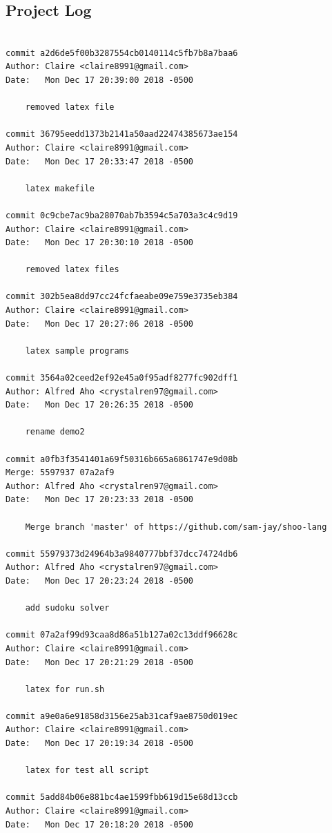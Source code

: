 \documentclass[12pt]{article}
\begin{document}
\subsection{Project Log}
\begin{lstlisting}

commit a2d6de5f00b3287554cb0140114c5fb7b8a7baa6
Author: Claire <claire8991@gmail.com>
Date:   Mon Dec 17 20:39:00 2018 -0500

    removed latex file

commit 36795eedd1373b2141a50aad22474385673ae154
Author: Claire <claire8991@gmail.com>
Date:   Mon Dec 17 20:33:47 2018 -0500

    latex makefile

commit 0c9cbe7ac9ba28070ab7b3594c5a703a3c4c9d19
Author: Claire <claire8991@gmail.com>
Date:   Mon Dec 17 20:30:10 2018 -0500

    removed latex files

commit 302b5ea8dd97cc24fcfaeabe09e759e3735eb384
Author: Claire <claire8991@gmail.com>
Date:   Mon Dec 17 20:27:06 2018 -0500

    latex sample programs

commit 3564a02ceed2ef92e45a0f95adf8277fc902dff1
Author: Alfred Aho <crystalren97@gmail.com>
Date:   Mon Dec 17 20:26:35 2018 -0500

    rename demo2

commit a0fb3f3541401a69f50316b665a6861747e9d08b
Merge: 5597937 07a2af9
Author: Alfred Aho <crystalren97@gmail.com>
Date:   Mon Dec 17 20:23:33 2018 -0500

    Merge branch 'master' of https://github.com/sam-jay/shoo-lang

commit 55979373d24964b3a9840777bbf37dcc74724db6
Author: Alfred Aho <crystalren97@gmail.com>
Date:   Mon Dec 17 20:23:24 2018 -0500

    add sudoku solver

commit 07a2af99d93caa8d86a51b127a02c13ddf96628c
Author: Claire <claire8991@gmail.com>
Date:   Mon Dec 17 20:21:29 2018 -0500

    latex for run.sh

commit a9e0a6e91858d3156e25ab31caf9ae8750d019ec
Author: Claire <claire8991@gmail.com>
Date:   Mon Dec 17 20:19:34 2018 -0500

    latex for test all script

commit 5add84b06e881bc4ae1599fbb619d15e68d13ccb
Author: Claire <claire8991@gmail.com>
Date:   Mon Dec 17 20:18:20 2018 -0500


\end{lstlisting}
\end{document}
